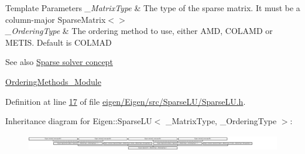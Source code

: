 \begin{DoxyTemplParams}{Template Parameters}
{\em \+\_\+\+Matrix\+Type} & The type of the sparse matrix. It must be a column-\/major Sparse\+Matrix$<$$>$ \\
\hline
{\em \+\_\+\+Ordering\+Type} & The ordering method to use, either A\+MD, C\+O\+L\+A\+MD or M\+E\+T\+IS. Default is C\+O\+L\+M\+AD\\
\hline
\end{DoxyTemplParams}


\begin{DoxySeeAlso}{See also}
\hyperlink{SparseLinearSystems.dox_TutorialSparseSolverConcept}{Sparse solver concept} 

\hyperlink{group___ordering_methods___module}{Ordering\+Methods\+\_\+\+Module} 
\end{DoxySeeAlso}


Definition at line \hyperlink{eigen_2_eigen_2src_2_sparse_l_u_2_sparse_l_u_8h_source_l00017}{17} of file \hyperlink{eigen_2_eigen_2src_2_sparse_l_u_2_sparse_l_u_8h_source}{eigen/\+Eigen/src/\+Sparse\+L\+U/\+Sparse\+L\+U.\+h}.

Inheritance diagram for Eigen\+:\+:Sparse\+LU$<$ \+\_\+\+Matrix\+Type, \+\_\+\+Ordering\+Type $>$\+:\begin{figure}[H]
\begin{center}
\leavevmode
\includegraphics[height=0.701461cm]{group___sparse_l_u___module}
\end{center}
\end{figure}
